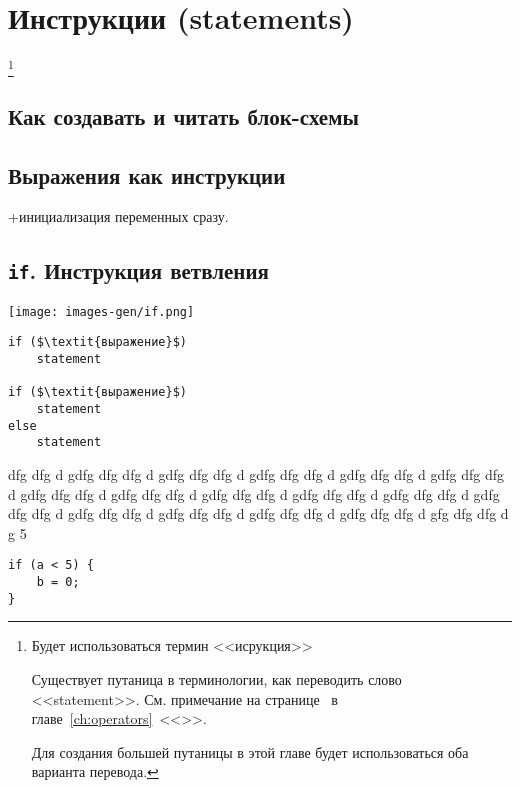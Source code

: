 \documentclass[myc.tex]{subfiles}
\begin{document}
\chapter{Инструкции (statements)}

\footnote{Будет использоваться термин <<исрукция>>


Существует путаница в терминологии, как переводить слово <<statement>>. См. примечание на странице~\pageref{ch:operators} в главе~\ref{ch:operators}~<<>>.

Для создания большей путаницы в этой главе будет использоваться оба варианта перевода.}


\section*{Как создавать и читать блок-схемы}



\section{Выражения как инструкции}


+инициализация переменных сразу.




\section{\texttt{if}. Инструкция ветвления}

\noindent
\texttt{[image: images-gen/if.png]}
\begin{lstlisting}
if ($\textit{выражение}$)
    statement
    
if ($\textit{выражение}$)
    statement
else
    statement
\end{lstlisting}






dfg dfg d gdfg dfg dfg d gdfg dfg dfg d gdfg dfg dfg d gdfg dfg dfg d gdfg dfg dfg d gdfg dfg dfg d gdfg dfg dfg d gdfg dfg dfg d gdfg dfg dfg d gdfg dfg dfg d gdfg dfg dfg d gdfg dfg dfg d gdfg dfg dfg d gdfg dfg dfg d gdfg dfg dfg d gfg dfg dfg d g
5

\begin{lstlisting}[caption=Пример использования оператора if]
if (a < 5) {
    b = 0;
}
\end{lstlisting}
\end{document}

